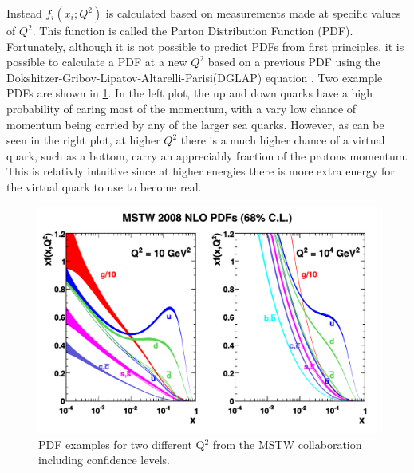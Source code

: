  Instead $f_{i}(x_{i};Q^{2})$ is calculated based on measurements made at specific values of $Q^{2}$. This function is called the Parton Distribution Function (PDF). Fortunately, although it is not possible to predict PDFs from first principles, it is possible to calculate a PDF at a new $Q^{2}$ based on a previous PDF using the Dokshitzer-Gribov-Lipatov-Altarelli-Parisi(DGLAP) equation \cite{DGLAP1}\cite{DGLAP2}\cite{DGLAP3}\cite{DGLAP4}. Two example PDFs are shown in \cref{fig:PDFExample}. In the left plot, the up and down quarks have a high probability of caring most of the momentum, with a vary low chance of momentum being carried by any of the larger sea quarks. However, as can be seen in the right plot, at higher $Q^2$ there is a much higher chance of a virtual quark, such as a bottom, carry an appreciably fraction of the protons momentum. This is relativly intuitive since at higher energies there is more extra energy for the virtual quark to use to become real.

\begin{figure}[!htbp]
    \centering
    \includegraphics[width=\textwidth]{figures/mstw_pdfs.pdf}
    \caption[
      Parton Distribution Function example
    ]{
      PDF examples for two different Q$^2$ from the MSTW collaboration including confidence levels.   \cite{PDFExample}
    }
    \label{fig:PDFExample}
\end{figure}
 
